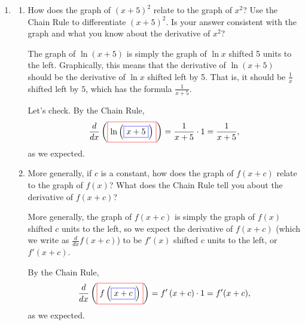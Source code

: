 \documentclass{article}
\begin{document}
\begin{enumerate}
\begin{enumerate}
  \end{enumerate}
\begin{problemonly}
    \newpage
\end{problemonly}
\item 

  \begin{enumerate}
  \item 
    \begin{problem}[\stretch{2}]
      How does the graph of $(x+5)^2$ relate to the graph of $x^2$?
      Use the Chain Rule to differentiate $(x+5)^2$.  Is your answer
      consistent with the graph and what you know about the derivative of
      $x^2$?
    \end{problem}

    \begin{solution}
      The graph of $\ln(x + 5)$ is simply the graph of $\ln x$ shifted 5
      units to the left.  Graphically, this means that the derivative of
      $\ln(x + 
      5)$ should be the derivative of $\ln x$ shifted left by 5.  That is,
      it should be $\frac{1}{x}$ shifted left by $5$, which has the
      formula $\frac{1}{x + 5}$. 

      Let's check.  By the Chain Rule,
      \[ \frac{d}{dx} \left(\fcolorbox{red}{white}{$\displaystyle
          \ln\left(\fcolorbox{blue}{white}{$\displaystyle x+
              5$}\right)$}\right) = \frac{1}{x+ 5}\cdot 1 = \frac{1}{x +
        5},\]
      as we expected.        
    \end{solution}

  \item
    \begin{problem}[\vfill]
      More generally, if $c$ is a constant, how does the graph of $f(x +
      c)$ relate to the graph of $f(x)$?  What does the Chain Rule tell
      you about the derivative of $f(x + c)$?
    \end{problem}

    \begin{solution}
      More generally, 
      the graph of $f(x + c)$ is simply the graph of $f(x)$ shifted $c$
      units to the left, so we expect the derivative of $f(x + c)$ (which
      we write as $\frac{d}{dx} f(x + c)$) to be $f'(x)$ shifted $c$ units
      to the left, or $f'(x + c)$. 

      By the Chain Rule,     
      \[ \frac{d}{dx} \left(\fcolorbox{red}{white}{$\displaystyle
          f\left(\fcolorbox{blue}{white}{$\displaystyle x+
              c$}\right)$}\right) = f'\left(x+ c\right)\cdot 1 = f'(x +
      c),\] as we expected. 
    \end{solution}    


\end{enumerate}
\end{enumerate}
\end{document}
